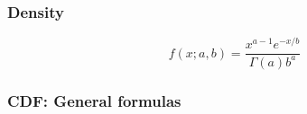 %
%
%


\subsubsection{Density}
\label{GammaDistributionDensity}

\begin{equation} 
	f(x; a, b)= \frac{x^{a-1}e^{-x/b}}{\Gamma(a) b^a}
\end{equation}

\subsubsection{CDF: General formulas}

